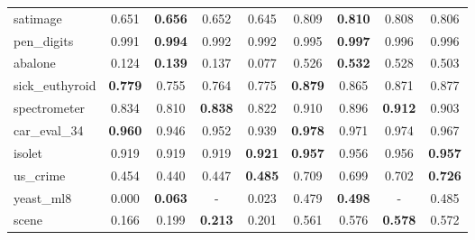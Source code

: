 \begin{figure}[ht]
\begin{tabular}{p{22mm}|*4{p{14mm}}|*4{p{14mm}}}
        satimage&\multicolumn{1}{c}{0.651}&\multicolumn{1}{c}{\textbf{0.656}}&\multicolumn{1}{c}{0.652}&\multicolumn{1}{c|}{0.645}&\multicolumn{1}{c}{0.809}&\multicolumn{1}{c}{\textbf{0.810}}&\multicolumn{1}{c}{0.808}&\multicolumn{1}{c}{0.806}\\
        pen\_digits&\multicolumn{1}{c}{0.991}&\multicolumn{1}{c}{\textbf{0.994}}&\multicolumn{1}{c}{0.992}&\multicolumn{1}{c|}{0.992}&\multicolumn{1}{c}{0.995}&\multicolumn{1}{c}{\textbf{0.997}}&\multicolumn{1}{c}{0.996}&\multicolumn{1}{c}{0.996}\\
        abalone&\multicolumn{1}{c}{0.124}&\multicolumn{1}{c}{\textbf{0.139}}&\multicolumn{1}{c}{0.137}&\multicolumn{1}{c|}{0.077}&\multicolumn{1}{c}{0.526}&\multicolumn{1}{c}{\textbf{0.532}}&\multicolumn{1}{c}{0.528}&\multicolumn{1}{c}{0.503}\\
        sick\_euthyroid&\multicolumn{1}{c}{\textbf{0.779}}&\multicolumn{1}{c}{0.755}&\multicolumn{1}{c}{0.764}&\multicolumn{1}{c|}{0.775}&\multicolumn{1}{c}{\textbf{0.879}}&\multicolumn{1}{c}{0.865}&\multicolumn{1}{c}{0.871}&\multicolumn{1}{c}{0.877}\\
        spectrometer&\multicolumn{1}{c}{0.834}&\multicolumn{1}{c}{0.810}&\multicolumn{1}{c}{\textbf{0.838}}&\multicolumn{1}{c|}{0.822}&\multicolumn{1}{c}{0.910}&\multicolumn{1}{c}{0.896}&\multicolumn{1}{c}{\textbf{0.912}}&\multicolumn{1}{c}{0.903}\\
        car\_eval\_34&\multicolumn{1}{c}{\textbf{0.960}}&\multicolumn{1}{c}{0.946}&\multicolumn{1}{c}{0.952}&\multicolumn{1}{c|}{0.939}&\multicolumn{1}{c}{\textbf{0.978}}&\multicolumn{1}{c}{0.971}&\multicolumn{1}{c}{0.974}&\multicolumn{1}{c}{0.967}\\
        isolet&\multicolumn{1}{c}{0.919}&\multicolumn{1}{c}{0.919}&\multicolumn{1}{c}{0.919}&\multicolumn{1}{c|}{\textbf{0.921}}&\multicolumn{1}{c}{\textbf{0.957}}&\multicolumn{1}{c}{0.956}&\multicolumn{1}{c}{0.956}&\multicolumn{1}{c}{\textbf{0.957}}\\
        us\_crime&\multicolumn{1}{c}{0.454}&\multicolumn{1}{c}{0.440}&\multicolumn{1}{c}{0.447}&\multicolumn{1}{c|}{\textbf{0.485}}&\multicolumn{1}{c}{0.709}&\multicolumn{1}{c}{0.699}&\multicolumn{1}{c}{0.702}&\multicolumn{1}{c}{\textbf{0.726}}\\
        yeast\_ml8&\multicolumn{1}{c}{0.000}&\multicolumn{1}{c}{\textbf{0.063}}&\multicolumn{1}{c}{-}&\multicolumn{1}{c|}{0.023}&\multicolumn{1}{c}{0.479}&\multicolumn{1}{c}{\textbf{0.498}}&\multicolumn{1}{c}{-}&\multicolumn{1}{c}{0.485}\\
        scene&\multicolumn{1}{c}{0.166}&\multicolumn{1}{c}{0.199}&\multicolumn{1}{c}{\textbf{0.213}}&\multicolumn{1}{c|}{0.201}&\multicolumn{1}{c}{0.561}&\multicolumn{1}{c}{0.576}&\multicolumn{1}{c}{\textbf{0.578}}&\multicolumn{1}{c}{0.572}\\

\end{tabular}
\end{figure}
